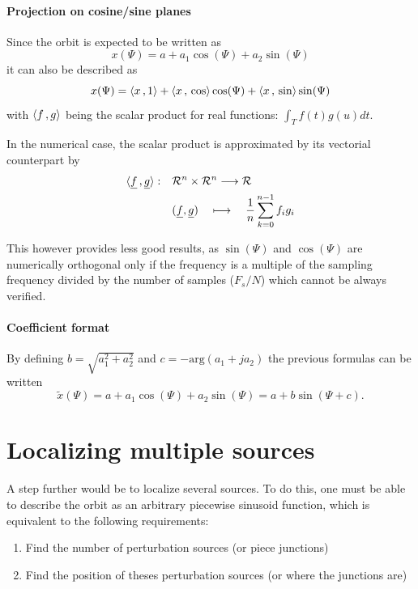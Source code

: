\paragraph{Projection on cosine/sine planes}
Since the orbit is expected to be written as
\begin{equation*}
x(\Psi) = a+ a_1 \cos(\Psi) + a_2 \sin(\Psi)
\end{equation*}
it can also be described as
\begin{equation}
x(\Psi) = \langle x {\,,\,} 1 \rangle + \langle x {\,,\,} \cos \rangle \cos(\Psi) + \langle x {\,,\,} \sin \rangle \sin(\Psi)
\end{equation}
with $\langle f {\,,\,} g \rangle$ being the scalar product for real functions: $\int_T f(t)g(u)dt$.

In the numerical case, the scalar product is approximated by its vectorial counterpart by
\begin{align*}
\langle \underline{f} {\,,\,} \underline{g} \rangle: \quad
 &\mathcal{R}^n \times \mathcal{R}^n \longrightarrow \mathcal{R} \\
 & (\underline{f},\underline{g}) \quad\longmapsto \quad \frac{1}{n}\sum\limits_{k=0}^{n-1} f_i g_i
\end{align*}

This however provides less good results, as $\sin(\Psi)$ and $\cos(\Psi)$ are numerically orthogonal only if the frequency is a multiple of the sampling frequency divided by the number of samples ($F_s/N$) which cannot be always verified.

\paragraph{Coefficient format}
By defining $b = \sqrt{a_1^2+a_2^2}$ and $c = -\mathrm{arg}(a_1 + j a_2)$ the previous formulas can be written
\begin{equation*}
\tilde{x}(\Psi) = a + a_1 \cos(\Psi) + a_2 \sin(\Psi) = a + b \sin(\Psi + c).
\end{equation*}

\section{Localizing multiple sources}
A step further would be to localize several sources. To do this, one must be able to describe the orbit as an arbitrary piecewise sinusoid function, which is equivalent to the following requirements:
\begin{enumerate}
    \item Find the number of perturbation sources (or piece junctions)
    \item Find the position of theses perturbation sources (or where the junctions are)
\end{enumerate}

